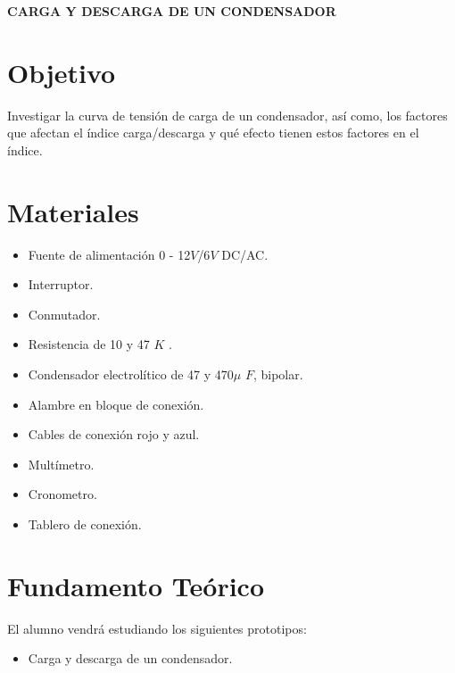 \begin{center}
	{\textbf{CARGA Y DESCARGA DE UN CONDENSADOR}}
\end{center}
\section{Objetivo}
Investigar la curva de tensión de carga de un condensador, así como, los factores que afectan el índice carga/descarga y qué efecto tienen estos factores en el índice.
\section{Materiales}
\begin{itemize}
	\item Fuente de alimentación 0 - 12$V$/6$V$ DC/AC.
	\item Interruptor.
	\item Conmutador.
	\item Resistencia de 10 y 47 $K$ \textohm.
	\item Condensador electrolítico de 47 y 470$ \mu $ $F$, bipolar.
	\item Alambre en bloque de conexión.
	\item Cables de conexión rojo y azul.
	\item Multímetro.
	\item Cronometro.
	\item Tablero de conexión.  
\end{itemize}
\section{Fundamento Teórico}
El alumno vendrá estudiando los siguientes prototipos:
\begin{itemize}
	\item Carga y descarga de un condensador.
\end{itemize}

